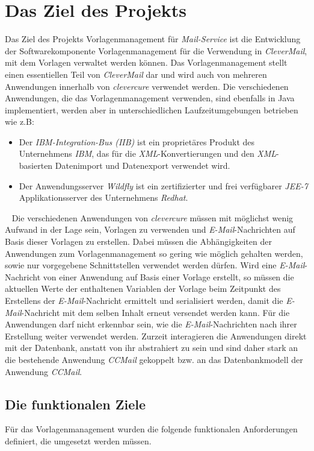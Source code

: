 \chapter{Das Ziel des Projekts}
\label{cha:Zielsetzung}
Das Ziel des Projekts Vorlagenmanagement für \emph{Mail-Service} ist die Entwicklung der Softwarekomponente Vorlagenmanagement für die Verwendung in \emph{CleverMail}, mit dem Vorlagen verwaltet werden können. Das Vorlagenmanagement stellt einen essentiellen Teil von \emph{CleverMail} dar und wird auch von mehreren Anwendungen innerhalb von \emph{clevercure} verwendet werden. Die verschiedenen Anwendungen, die das Vorlagenmanagement verwenden, sind ebenfalls in Java implementiert, werden aber in unterschiedlichen Laufzeitumgebungen betrieben wie z.B:
\begin{itemize}
	\item Der \emph{IBM-Integration-Bus (IIB)}
	\newline
	ist ein proprietäres Produkt des Unternehmens \emph{IBM}, das für die \emph{XML}-Konvertierungen und den \emph{XML}-basierten Datenimport und Datenexport verwendet wird.
	\item Der Anwendungsserver \emph{Wildfly}
	\newline
	ist ein zertifizierter und frei verfügbarer \emph{JEE-7} Applikationsserver des Unternehmens \emph{Redhat}.
\end{itemize} 
\ \newline
Die verschiedenen Anwendungen von \emph{clevercure} müssen mit möglichst wenig Aufwand in der Lage sein, Vorlagen zu verwenden und \emph{E-Mail}-Nachrichten auf Basis dieser Vorlagen zu erstellen. Dabei müssen die Abhängigkeiten der Anwendungen zum Vorlagenmanagement so gering wie möglich gehalten werden, sowie nur vorgegebene Schnittstellen verwendet werden dürfen. Wird eine \emph{E-Mail}-Nachricht von einer Anwendung auf Basis einer Vorlage erstellt, so müssen die  aktuellen Werte der enthaltenen Variablen der Vorlage beim Zeitpunkt des Erstellens der \emph{E-Mail}-Nachricht ermittelt und serialisiert werden, damit die \emph{E-Mail}-Nachricht mit dem selben Inhalt erneut versendet werden kann. Für die Anwendungen darf nicht erkennbar sein, wie die \emph{E-Mail}-Nachrichten nach ihrer Erstellung weiter verwendet werden. Zurzeit interagieren die Anwendungen direkt mit der Datenbank, anstatt von ihr abstrahiert zu sein und sind daher stark an die bestehende Anwendung \emph{CCMail} gekoppelt bzw. an das Datenbankmodell der Anwendung \emph{CCMail}.
\newpage

\section{Die funktionalen Ziele}
Für das Vorlagenmanagement wurden die folgende funktionalen Anforderungen definiert, die umgesetzt werden müssen.

